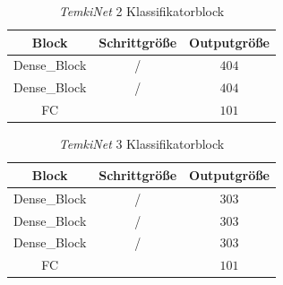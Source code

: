 \documentclass[12pt,a4paper]{scrartcl}
\numberwithin{equation}{section}
\begin{document}
\begin{table}[h!]
	\centering
	\begin{tabular}{|c|c|c|}
		\hline
		Block & Schrittgröße & Outputgröße\\ \hline
		Dense\_Block & / &$ 404 $\\ \hline
		Dense\_Block & / &$ 404 $\\ \hline
		FC & & $ 101 $\\ \hline
		
	\end{tabular}
	\caption{\textit{TemkiNet} 2 Klassifikatorblock}
	\label{tab:Temki_Architectur 2}
\end{table}

\begin{table}[h!]
	\centering
	\begin{tabular}{|c|c|c|}
		\hline
		Block & Schrittgröße & Outputgröße\\ \hline
		Dense\_Block & / &$ 303 $\\ \hline
		Dense\_Block & / &$ 303 $\\ \hline
		Dense\_Block & / &$ 303 $\\ \hline
		FC & & $ 101 $\\ \hline
		
	\end{tabular}
	\caption{\textit{TemkiNet} 3 Klassifikatorblock }
	\label{tab:Temki_Architectur 3}
\end{table}
\end{document}
